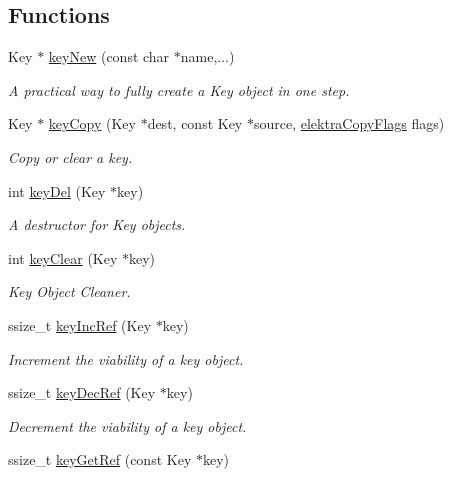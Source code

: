 \subsection*{Functions}
\begin{DoxyCompactItemize}
\item 
Key $\ast$ \hyperlink{group__key_gad23c65b44bf48d773759e1f9a4d43b89}{key\+New} (const char $\ast$name,...)
\begin{DoxyCompactList}\small\item\em A practical way to fully create a Key object in one step. \end{DoxyCompactList}\item 
Key $\ast$ \hyperlink{group__key_ga505575ebef060066984fe0f590081e37}{key\+Copy} (Key $\ast$dest, const Key $\ast$source, \hyperlink{group__key_ga9ff42b1e9a97222562bfda3dd1f8c735}{elektra\+Copy\+Flags} flags)
\begin{DoxyCompactList}\small\item\em Copy or clear a key. \end{DoxyCompactList}\item 
int \hyperlink{group__key_ga3df95bbc2494e3e6703ece5639be5bb1}{key\+Del} (Key $\ast$key)
\begin{DoxyCompactList}\small\item\em A destructor for Key objects. \end{DoxyCompactList}\item 
int \hyperlink{group__key_gab2242311a36bbc0520e0d36895107ec1}{key\+Clear} (Key $\ast$key)
\begin{DoxyCompactList}\small\item\em Key Object Cleaner. \end{DoxyCompactList}\item 
ssize\+\_\+t \hyperlink{group__key_ga6970a6f254d67af7e39f8e469bb162f1}{key\+Inc\+Ref} (Key $\ast$key)
\begin{DoxyCompactList}\small\item\em Increment the viability of a key object. \end{DoxyCompactList}\item 
ssize\+\_\+t \hyperlink{group__key_ga2c6433ca22109e4e141946057eccb283}{key\+Dec\+Ref} (Key $\ast$key)
\begin{DoxyCompactList}\small\item\em Decrement the viability of a key object. \end{DoxyCompactList}\item 
ssize\+\_\+t \hyperlink{group__key_ga4aabc4272506dd63161db2bbb42de8ae}{key\+Get\+Ref} (const Key $\ast$key)

\end{DoxyCompactItemize}
